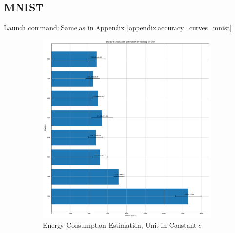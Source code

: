     \subsection{MNIST}
    \label{appendix:energy_gpu_mnist}
        Launch command: Same as in Appendix \ref{appendix:accuracy_curves_mnist}

        \begin{figure}[H]
            \centering
            \begin{subfigure}[H]{0.48\textwidth}
                \includegraphics[width=\textwidth]{../standard/MNIST/plots/mnist_train_energy_gpu.pdf}
                \caption{Energy Consumption Estimation, Unit in Constant $c$}
            \end{subfigure}
            \hfill
            \begin{subfigure}[H]{0.48\textwidth}

\end{subfigure}
\end{figure}
